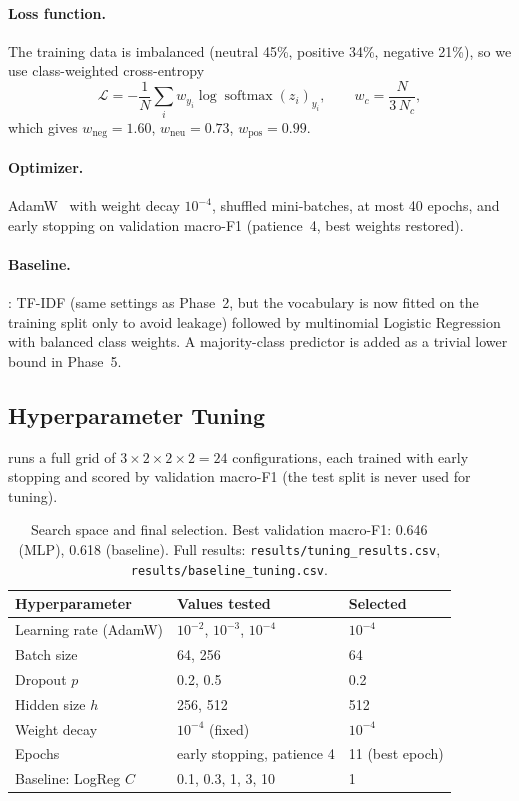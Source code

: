 \documentclass[11pt,a4paper]{article}
\begin{document}
\paragraph{Loss function.} The training data is imbalanced (neutral 45\%, positive 34\%,
negative 21\%), so we use class-weighted cross-entropy
\[
\mathcal{L} = -\frac{1}{N}\sum_{i} w_{y_i}\log \operatorname{softmax}(z_i)_{y_i},\qquad
w_c = \frac{N}{3\,N_c},
\]
which gives $w_{\text{neg}} = 1.60$, $w_{\text{neu}} = 0.73$, $w_{\text{pos}} = 0.99$.

\paragraph{Optimizer.} AdamW~\cite{adamw} with weight decay $10^{-4}$, shuffled mini-batches,
at most 40 epochs, and early stopping on validation macro-F1 (patience~4, best weights
restored).

\paragraph{Baseline.} : TF-IDF (same settings as Phase~2, but the
vocabulary is now fitted on the training split only to avoid leakage) followed by multinomial
Logistic Regression with balanced class weights. A majority-class predictor is added as a
trivial lower bound in Phase~5.

\subsection{Hyperparameter Tuning}
 runs a full grid of $3 \times 2 \times 2 \times 2 = 24$ configurations, each
trained with early stopping and scored by validation macro-F1 (the test split is never used
for tuning).

\begin{table}[H]
\centering
\small
\begin{tabular}{lll}
\toprule
\textbf{Hyperparameter} & \textbf{Values tested} & \textbf{Selected} \\
\midrule
Learning rate (AdamW) & $10^{-2}$, $10^{-3}$, $10^{-4}$ & $10^{-4}$ \\
Batch size            & 64, 256                         & 64 \\
Dropout $p$           & 0.2, 0.5                        & 0.2 \\
Hidden size $h$       & 256, 512                        & 512 \\
Weight decay          & $10^{-4}$ (fixed)               & $10^{-4}$ \\
Epochs                & early stopping, patience 4      & 11 (best epoch) \\
\midrule
Baseline: LogReg $C$  & 0.1, 0.3, 1, 3, 10              & 1 \\
\bottomrule
\end{tabular}
\caption{Search space and final selection. Best validation macro-F1: 0.646 (MLP), 0.618
(baseline). Full results: \texttt{results/tuning\_results.csv}, \texttt{results/baseline\_tuning.csv}.}
\label{tab:grid}
\end{table}
\end{document}
